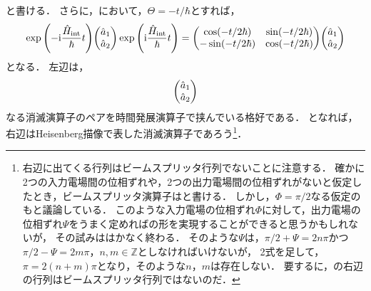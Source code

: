 \documentclass{report}
\begin{document}
    と書ける．
    さらに，において，$\Theta = -t / \hbar$とすれば，
    \begin{align}
      \exp\qty(-\i\frac{\hat{H}_{\r{int}}}{\hbar}t)\mqty(\hat{a}_1 \\ \hat{a}_2)\exp\qty(\i\frac{\hat{H}_{\r{int}}}{\hbar}t) = \mqty(
        \cos(-t / 2\hbar) & \sin(-t / 2\hbar) \\ 
        -\sin(-t / 2\hbar) & \cos(-t / 2\hbar)
      )\mqty(\hat{a}_1 \\ \hat{a}_2)
    \end{align}
    となる．
    左辺は，
    \begin{align}
      \mqty(\hat{a}_1 \\ \hat{a}_2)
    \end{align}
    なる消滅演算子のペアを時間発展演算子で挟んでいる格好である．
    となれば，右辺はHeisenberg描像で表した消滅演算子であろう\footnote{
      右辺に出てくる行列はビームスプリッタ行列でないことに注意する．
      確かに2つの入力電場間の位相ずれや，2つの出力電場間の位相ずれがないと仮定したとき，ビームスプリッタ演算子はと書ける．
      しかし，$\Phi = \pi / 2$なる仮定のもと議論している．
      このような入力電場の位相ずれ$\Phi$に対して，出力電場の位相ずれ$\Psi$をうまく定めればの形を実現することができると思うかもしれないが，
      その試みははかなく終わる．
      そのような$\Psi$は，$\pi / 2 + \Psi = 2n\pi$かつ$\pi / 2 - \Psi = 2m\pi$，$n, m \in \mathbb{Z}$としなければいけないが，
      2式を足して，$\pi = 2(n + m)\pi$となり，そのような$n$，$m$は存在しない．
      要するに，の右辺の行列はビームスプリッタ行列ではないのだ．
      }．
\end{document}
